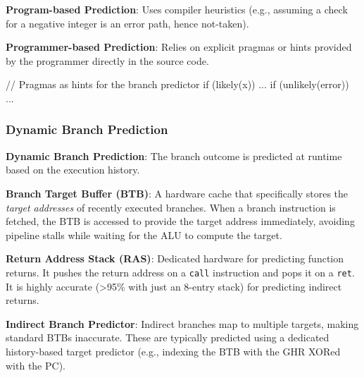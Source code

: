 \begin{definition}
	\textbf{Program-based Prediction}: Uses compiler heuristics (e.g., assuming a check for a negative integer is an error path, hence not-taken).
\end{definition}

\begin{definition}
	\textbf{Programmer-based Prediction}: Relies on explicit pragmas or hints provided by the programmer directly in the source code.
\end{definition}

\begin{codeexample}
	// Pragmas as hints for the branch predictor
	if (likely(x)) {...}
	if (unlikely(error)) {...}
\end{codeexample}

\subsubsection{Dynamic Branch Prediction}

\begin{definition}
	\textbf{Dynamic Branch Prediction}: The branch outcome is predicted at runtime based on the execution history.
\end{definition}

\begin{definition}
	\textbf{Branch Target Buffer (BTB)}: A hardware cache that specifically stores the \textit{target addresses} of recently executed branches. When a branch instruction is fetched, the BTB is accessed to provide the target address immediately, avoiding pipeline stalls while waiting for the ALU to compute the target.
\end{definition}

\begin{definition}
	\textbf{Return Address Stack (RAS)}: Dedicated hardware for predicting function returns. It pushes the return address on a \texttt{call} instruction and pops it on a \texttt{ret}. It is highly accurate (>95\% with just an 8-entry stack) for predicting indirect returns.
\end{definition}

\begin{definition}
	\textbf{Indirect Branch Predictor}: Indirect branches map to multiple targets, making standard BTBs inaccurate. These are typically predicted using a dedicated history-based target predictor (e.g., indexing the BTB with the GHR XORed with the PC).
\end{definition}

